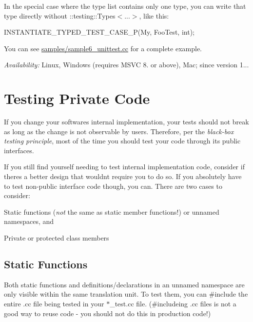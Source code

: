 In the special case where the type list contains only one type, you can write that type directly without {\ttfamily \+::testing\+::\+Types$<$...$>$}, like this\+:


\begin{DoxyCode}
INSTANTIATE\_TYPED\_TEST\_CASE\_P(My, FooTest, int);
\end{DoxyCode}


You can see {\ttfamily \hyperlink{sample6__unittest_8cc}{samples/sample6\+\_\+unittest.\+cc}} for a complete example.

{\itshape Availability\+:} Linux, Windows (requires M\+S\+VC 8. or above), Mac; since version 1...

\section*{Testing Private Code}

If you change your software\textquotesingle{}s internal implementation, your tests should not break as long as the change is not observable by users. Therefore, per the {\itshape black-\/box testing principle}, most of the time you should test your code through its public interfaces.

If you still find yourself needing to test internal implementation code, consider if there\textquotesingle{}s a better design that wouldn\textquotesingle{}t require you to do so. If you absolutely have to test non-\/public interface code though, you can. There are two cases to consider\+:


\begin{DoxyItemize}
\item Static functions ({\itshape not} the same as static member functions!) or unnamed namespaces, and
\item Private or protected class members
\end{DoxyItemize}

\subsection*{Static Functions}

Both static functions and definitions/declarations in an unnamed namespace are only visible within the same translation unit. To test them, you can {\ttfamily \#include} the entire {\ttfamily .cc} file being tested in your {\ttfamily $\ast$\+\_\+test.cc} file. ({\ttfamily \#include}ing {\ttfamily .cc} files is not a good way to reuse code -\/ you should not do this in production code!)

